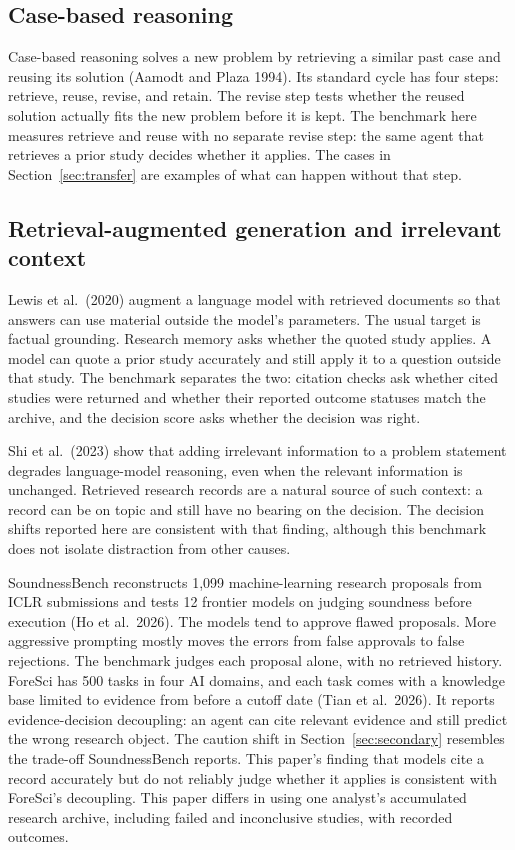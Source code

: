\documentclass[11pt]{article}
\begin{document}
\subsection{Case-based reasoning}

Case-based reasoning solves a new problem by retrieving a similar past case and reusing its solution (Aamodt and Plaza 1994). Its standard cycle has four steps: retrieve, reuse, revise, and retain. The revise step tests whether the reused solution actually fits the new problem before it is kept. The benchmark here measures retrieve and reuse with no separate revise step: the same agent that retrieves a prior study decides whether it applies. The cases in Section~\ref{sec:transfer} are examples of what can happen without that step.

\subsection{Retrieval-augmented generation and irrelevant context}

Lewis et al.\ (2020) augment a language model with retrieved documents so that answers can use material outside the model's parameters. The usual target is factual grounding. Research memory asks whether the quoted study applies. A model can quote a prior study accurately and still apply it to a question outside that study. The benchmark separates the two: citation checks ask whether cited studies were returned and whether their reported outcome statuses match the archive, and the decision score asks whether the decision was right.

Shi et al.\ (2023) show that adding irrelevant information to a problem statement degrades language-model reasoning, even when the relevant information is unchanged. Retrieved research records are a natural source of such context: a record can be on topic and still have no bearing on the decision. The decision shifts reported here are consistent with that finding, although this benchmark does not isolate distraction from other causes.

SoundnessBench reconstructs 1,099 machine-learning research proposals from ICLR submissions and tests 12 frontier models on judging soundness before execution (Ho et al.\ 2026). The models tend to approve flawed proposals. More aggressive prompting mostly moves the errors from false approvals to false rejections. The benchmark judges each proposal alone, with no retrieved history. ForeSci has 500 tasks in four AI domains, and each task comes with a knowledge base limited to evidence from before a cutoff date (Tian et al.\ 2026). It reports evidence-decision decoupling: an agent can cite relevant evidence and still predict the wrong research object. The caution shift in Section~\ref{sec:secondary} resembles the trade-off SoundnessBench reports. This paper's finding that models cite a record accurately but do not reliably judge whether it applies is consistent with ForeSci's decoupling. This paper differs in using one analyst's accumulated research archive, including failed and inconclusive studies, with recorded outcomes.
\end{document}
